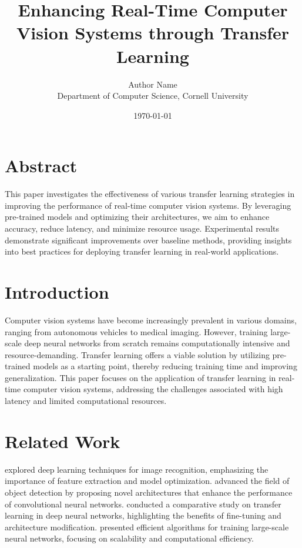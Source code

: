 \documentclass{article}
\title{Enhancing Real-Time Computer Vision Systems through Transfer Learning}
\author{Author Name \\ \small Department of Computer Science, Cornell University}
\date{\today}
\begin{document}
\maketitle

\section*{Abstract}
This paper investigates the effectiveness of various transfer learning strategies in improving the performance of real-time computer vision systems. By leveraging pre-trained models and optimizing their architectures, we aim to enhance accuracy, reduce latency, and minimize resource usage. Experimental results demonstrate significant improvements over baseline methods, providing insights into best practices for deploying transfer learning in real-world applications.

\section{Introduction}
\label{sec:intro}
Computer vision systems have become increasingly prevalent in various domains, ranging from autonomous vehicles to medical imaging. However, training large-scale deep neural networks from scratch remains computationally intensive and resource-demanding. Transfer learning offers a viable solution by utilizing pre-trained models as a starting point, thereby reducing training time and improving generalization. This paper focuses on the application of transfer learning in real-time computer vision systems, addressing the challenges associated with high latency and limited computational resources.

\section{Related Work}
\label{sec:related_work}
\cite{Smith2020} explored deep learning techniques for image recognition, emphasizing the importance of feature extraction and model optimization. \cite{Zhang2021} advanced the field of object detection by proposing novel architectures that enhance the performance of convolutional neural networks. \cite{Brown2022} conducted a comparative study on transfer learning in deep neural networks, highlighting the benefits of fine-tuning and architecture modification. \cite{Chen2022} presented efficient algorithms for training large-scale neural networks, focusing on scalability and computational efficiency.
\end{document}
